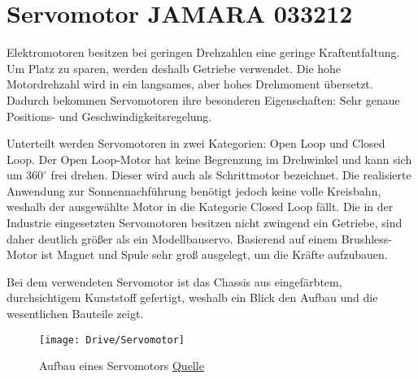 %
%
%

	
\chapter{Servomotor JAMARA 033212}




Elektromotoren besitzen bei geringen Drehzahlen eine geringe Kraftentfaltung. Um Platz zu sparen, werden deshalb Getriebe verwendet. Die hohe Motordrehzahl wird in ein langsames, aber hohes Drehmoment übersetzt. Dadurch bekommen Servomotoren ihre besonderen Eigenschaften: Sehr genaue Positions- und Geschwindigkeitsregelung. \cite{Bernstein:2018} 

\bigskip

Unterteilt werden Servomotoren in zwei Kategorien: Open Loop und Closed Loop. Der Open Loop-Motor hat keine Begrenzung im Drehwinkel und kann sich um $360^\circ$ frei drehen. Dieser wird auch als Schrittmotor bezeichnet. Die realisierte Anwendung zur Sonnennachführung benötigt jedoch keine volle Kreisbahn, weshalb der ausgewählte Motor in die Kategorie Closed Loop fällt. Die in der Industrie eingesetzten Servomotoren besitzen nicht zwingend ein Getriebe, sind daher deutlich größer als ein Modellbauservo. Basierend auf einem Brushless-Motor ist Magnet und Spule sehr groß ausgelegt, um die Kräfte aufzubauen.  

\bigskip

Bei dem verwendeten Servomotor ist das Chassis aus eingefärbtem, durchsichtigem Kunststoff gefertigt, weshalb ein Blick den Aufbau und die wesentlichen Bauteile zeigt.

\begin{figure}
    \begin{flushleft}
        \texttt{[image: Drive/Servomotor]}
        \caption{Aufbau eines Servomotors \href{https://a.pololu-files.com/picture/0J3188.450.jpg?8db0bf79b0d26db613e6730cedbc62f7}{Quelle}}
    \end{flushleft}
\end{figure}



